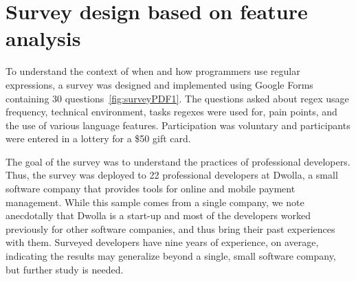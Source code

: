 \section{Survey design based on feature analysis}

To understand the context of when and how programmers use regular expressions,
a survey was designed and implemented using Google Forms containing 30 questions~\ref{fig:surveyPDF1}. The questions asked about regex usage frequency, technical environment, tasks regexes were used for, pain points, and the use of various language
features.
Participation was voluntary and participants were entered in a lottery for a \$50 gift card.

The goal of the survey was to understand the practices of professional developers. Thus, the survey was deployed to 22 professional developers at Dwolla, a small software company that provides tools for online and mobile payment management. While this sample comes from a single company, we note anecdotally that Dwolla is a start-up and most of the developers worked previously for other software companies, and thus bring their past experiences with them. Surveyed developers have nine years of experience, on average, indicating the results may generalize beyond a single, small software company, but further study is needed.

